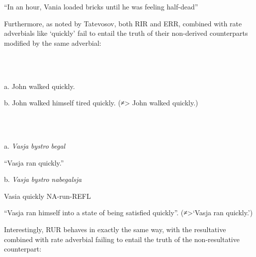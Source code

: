 \documentclass[output=paper,modfonts, nonflat]{langsci/langscibook}
\begin{document}
\begin{styleinnerExample}
\begin{styleinnerExample}
    “In an hour, Vania loaded bricks until he was feeling half-dead”
\end{styleinnerExample}

Furthermore, as noted by Tatevosov, both RIR and ERR, combined with rate adverbials like ‘quickly’ fail to entail the truth of their non-derived counterparts modified by the same adverbial:

\begin{styleinnerExample}
\ea%
    \label{ex:key:39}
    \gll\\
        \\
    \glt
    \z

          a.  John walked quickly.
\end{styleinnerExample}

\begin{styleinnerExample}
  b.  John walked himself tired quickly. (≠> John walked quickly.) 
\end{styleinnerExample}

\begin{styleinnerExample}
\ea%
    \label{ex:key:40}
    \gll\\
        \\
    \glt
    \z

          a.  \textit{Vasja} \textit{bystro} \textit{begal}
\end{styleinnerExample}

\begin{styleinnerExample}
    “Vasja ran quickly.” 
\end{styleinnerExample}

\begin{styleinnerExample}
  b.  \textit{Vasja} \textit{bystro} \textit{nabegalsja}
\end{styleinnerExample}

\begin{styleinnerExample}
    Vasia quickly NA-run-REFL
\end{styleinnerExample}

\begin{styleinnerExample}
    “Vasja ran himself into a state of being satisfied quickly”. (≠>‘Vasja ran quickly.’) 
\end{styleinnerExample}

Interestingly, RUR behaves in exactly the same way, with the resultative combined with rate adverbial failing to entail the truth of the non-resultative counterpart:


\end{styleinnerExample}
\end{document}
